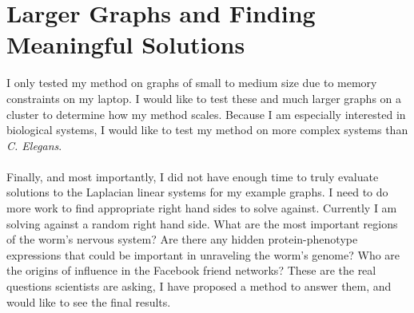 \documentclass{article}
\begin{document}
\section{Larger Graphs and Finding Meaningful Solutions}
I only tested my method on graphs of small to medium size due to memory constraints on my laptop. I would like to test these and much larger graphs on a cluster to determine how my method scales. Because I am especially interested in biological systems, I would like to test my method on more complex systems than \textit{C. Elegans}.\\
 \\
Finally, and most importantly, I did not have enough time to truly evaluate solutions to the Laplacian linear systems for my example graphs. I need to do more work to find appropriate right hand sides to solve against. Currently I am solving against a random right hand side. What are the most important regions of the worm's nervous system? Are there any hidden protein-phenotype expressions that could be important in unraveling the worm's genome? Who are the origins of influence in the Facebook friend networks? These are the real questions scientists are asking, I have proposed a method to answer them, and would like to see the final results.
%
%
\end{document}
